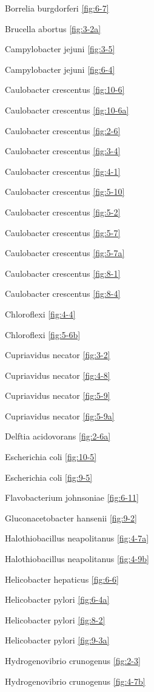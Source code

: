 \documentclass[]{tufte-book}
\begin{document}
Borrelia burgdorferi \ref{fig:6-7}

Brucella abortus \ref{fig:3-2a}

Campylobacter jejuni \ref{fig:3-5}

Campylobacter jejuni \ref{fig:6-4}

Caulobacter crescentus \ref{fig:10-6}

Caulobacter crescentus \ref{fig:10-6a}

Caulobacter crescentus \ref{fig:2-6}

Caulobacter crescentus \ref{fig:3-4}

Caulobacter crescentus \ref{fig:4-1}

Caulobacter crescentus \ref{fig:5-10}

Caulobacter crescentus \ref{fig:5-2}

Caulobacter crescentus \ref{fig:5-7}

Caulobacter crescentus \ref{fig:5-7a}

Caulobacter crescentus \ref{fig:8-1}

Caulobacter crescentus \ref{fig:8-4}

Chloroflexi \ref{fig:4-4}

Chloroflexi \ref{fig:5-6b}

Cupriavidus necator \ref{fig:3-2}

Cupriavidus necator \ref{fig:4-8}

Cupriavidus necator \ref{fig:5-9}

Cupriavidus necator \ref{fig:5-9a}

Delftia acidovorans \ref{fig:2-6a}

Escherichia coli \ref{fig:10-5}

Escherichia coli \ref{fig:9-5}

Flavobacterium johnsoniae \ref{fig:6-11}

Gluconacetobacter hansenii \ref{fig:9-2}

Halothiobacillus neapolitanus \ref{fig:4-7a}

Halothiobacillus neapolitanus \ref{fig:4-9b}

Helicobacter hepaticus \ref{fig:6-6}

Helicobacter pylori \ref{fig:6-4a}

Helicobacter pylori \ref{fig:8-2}

Helicobacter pylori \ref{fig:9-3a}

Hydrogenovibrio crunogenus \ref{fig:2-3}

Hydrogenovibrio crunogenus \ref{fig:4-7b}
\end{document}

